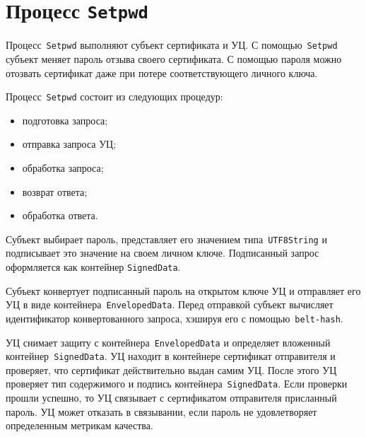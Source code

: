 \section{Процесс \texttt{Setpwd}}\label{PROCESSES.Setpwd}

Процесс~\texttt{Setpwd} выполняют субъект сертификата и УЦ.
С помощью~\texttt{Setpwd} субъект меняет пароль отзыва своего 
сертификата. С помощью пароля можно отозвать сертификат даже при потере 
соответствующего личного ключа.




Процесс~\texttt{Setpwd} состоит из следующих процедур:
\begin{itemize}
\item
подготовка запроса;
\item
отправка запроса УЦ;
\item
обработка запроса;
\item
возврат ответа;
\item
обработка ответа.
\end{itemize}

Субъект выбирает пароль, представляет его значением типа~\texttt{UTF8String}
и подписывает это значение на своем личном ключе.
Подписанный запрос оформляется как контейнер \texttt{SignedData}.
%


Субъект конвертует подписанный пароль на открытом ключе УЦ
и отправляет его УЦ в виде контейнера~\texttt{EnvelopedData}.
Перед отправкой субъект вычисляет идентификатор конвертованного запроса,
хэшируя его с помощью~\texttt{belt-hash}.

УЦ снимает защиту с контейнера~\texttt{EnvelopedData} и определяет 
вложенный контейнер~\texttt{SignedData}. УЦ находит в контейнере
сертификат отправителя и проверяет, что сертификат действительно 
выдан самим УЦ. После этого УЦ проверяет тип содержимого и подпись 
контейнера~\texttt{SignedData}.  Если проверки прошли успешно, то УЦ  
связывает с сертификатом отправителя присланный пароль. УЦ может отказать 
в связывании, если пароль не удовлетворяет определенным метрикам качества.

